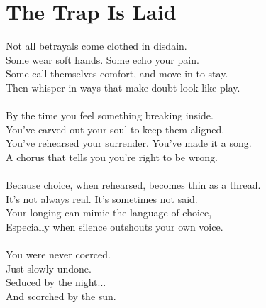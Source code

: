 \part{The Trap Is Laid}

\vfill

\begin{flushright}
  \Large
  Not all betrayals come clothed in disdain. \\
  Some wear soft hands. Some echo your pain. \\
  Some call themselves comfort, and move in to stay. \\
  Then whisper in ways that make doubt look like play. \\
  \ \\
  By the time you feel something breaking inside. \\
  You’ve carved out your soul to keep them aligned. \\
  You’ve rehearsed your surrender. You’ve made it a song. \\
  A chorus that tells you you’re right to be wrong. \\
  \ \\
  Because choice, when rehearsed, becomes thin as a thread. \\
  It’s not always real. It’s sometimes not said. \\
  Your longing can mimic the language of choice, \\
  Especially when silence outshouts your own voice. \\
  \ \\
  You were never coerced. \\
  Just slowly undone. \\
  Seduced by the night... \\
  And scorched by the sun. \\
  \end{flushright}


